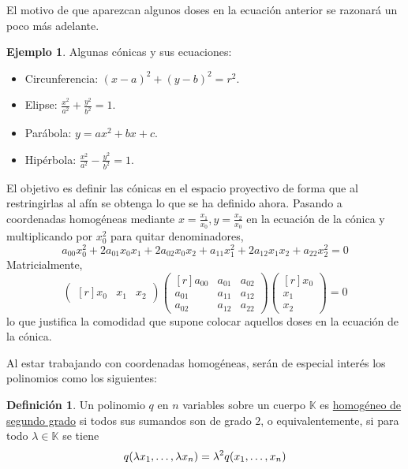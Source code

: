 \documentclass[12pt]{report}
\theoremstyle{definition}
\newtheorem{definition}{Definición}[chapter]
\theoremstyle{definition}
\newtheorem{example}{Ejemplo}[chapter]
\theoremstyle{remark}
\begin{document}
El motivo de que aparezcan algunos doses en la ecuación anterior se razonará un poco más adelante.

\begin{example}
Algunas cónicas y sus ecuaciones:
\begin{itemize}
    \item Circunferencia: $(x-a)^2+(y-b)^2=r^2$.
    \item Elipse: $\frac{x^2}{a^2}+\frac{y^2}{b^2} =1$.
    \item Parábola: $y = ax^2+bx+c$.
    \item Hipérbola: $\frac{x^2}{a^2}-\frac{y^2}{b^2}=1$.
\end{itemize}
\end{example}

El objetivo es definir las cónicas en el espacio proyectivo de forma que al restringirlas al afín se obtenga lo que se ha definido ahora. Pasando a coordenadas homogéneas mediante $x = \frac{x_1}{x_0}, y = \frac{x_2}{x_0}$ en la ecuación de la cónica y multiplicando por $x_0^2$ para quitar denominadores,
\[a_{00}x_0^2+2a_{01}x_0x_1+2a_{02}x_0x_2+a_{11}x_1^2+2a_{12}x_1x_2+a_{22}x_2^2=0\]
Matricialmente,
\[
\begin{pmatrix*}[r]
x_0 & x_1 & x_2
\end{pmatrix*} \begin{pmatrix*}[r]
a_{00} & a_{01} & a_{02} \\
a_{01} & a_{11} & a_{12} \\
a_{02} & a_{12} & a_{22}
\end{pmatrix*} \begin{pmatrix*}[r]
    x_0 \\
    x_1 \\
    x_2
\end{pmatrix*} = 0
\]
lo que justifica la comodidad que supone colocar aquellos doses en la ecuación de la cónica.


\vspace{2mm}
Al estar trabajando con coordenadas homogéneas, serán de especial interés los polinomios como los siguientes:
\begin{definition}
Un polinomio $q$ en $n$ variables sobre un cuerpo $\mathbb{K}$ es \ul{homogéneo de segundo grado} si todos sus sumandos son de grado $2$, o equivalentemente, si para todo $\lambda \in \mathbb{K}$ se tiene
\[q(\lambda x_1,\mathellipsis,\lambda x_n) = \lambda^2q(x_1,\mathellipsis,x_n)\]
\end{definition}
\end{document}
